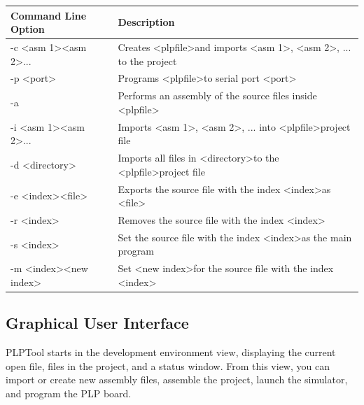 \documentclass{article}
\begin{document}
\begin{tabular}{ | l | l | }
\hline
Command Line Option & Description \\ \hline
-c \textless asm 1\textgreater  \textless asm 2\textgreater  ... & Creates \textless plpfile\textgreater  and imports \textless asm 1\textgreater , \textless asm 2\textgreater , ... to the project \\
-p \textless port\textgreater  	& Programs \textless plpfile\textgreater  to serial port \textless port\textgreater  \\
-a 	& Performs an assembly of the source files inside \textless plpfile\textgreater  \\
-i \textless asm 1\textgreater  \textless asm 2\textgreater  ... 	& Imports \textless asm 1\textgreater , \textless asm 2\textgreater , ... into \textless plpfile\textgreater  project file \\

-d \textless directory\textgreater  	& Imports all files in \textless directory\textgreater  to the \textless plpfile\textgreater  project file \\
-e \textless index\textgreater  \textless file\textgreater  	& Exports the source file with the index \textless index\textgreater  as \textless file\textgreater  \\
-r \textless index\textgreater  	& Removes the source file with the index \textless index\textgreater  \\
-s \textless index\textgreater  	& Set the source file with the index \textless index\textgreater  as the main program\\

-m \textless index\textgreater  \textless new index\textgreater  	& Set \textless new index\textgreater  for the source file with the index \textless index\textgreater  \\
\hline
\end{tabular}

\subsection{Graphical User Interface}
PLPTool starts in the development environment view, displaying the current open file, files in the project, and a status window. From this view, you can import or create new assembly files, assemble the project, launch the simulator, and program the PLP board. 
\end{document}
